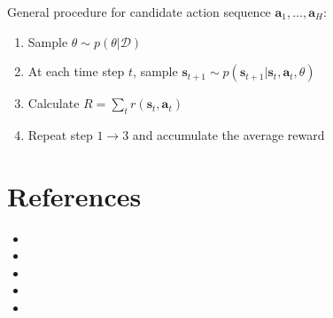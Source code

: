 General procedure for candidate action sequence $\textbf{a}_1,\dots, \textbf{a}_H$:
\begin{enumerate}
	\item Sample $\theta \sim p(\theta | \mathcal{D})$
	\item At each time step $t$, sample $\textbf{s}_{t+1} \sim p(\textbf{s}_{t+1} | \textbf{s}_t, \textbf{a}_t, \theta) $
	\item Calculate $R = \sum_{t} r(\textbf{s}_t, \textbf{a}_t)$
	\item Repeat step $1\rightarrow3$ and accumulate the average reward
\end{enumerate}

\section{References}
\begin{itemize}
	\item {}
	\item {}
	\item {}
	\item {}
	\item {}
\end{itemize}